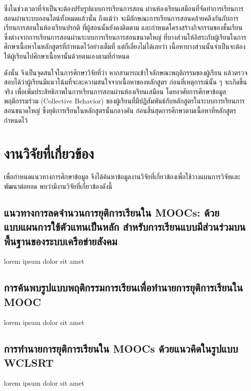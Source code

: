 \documentclass[conference]{IEEEtran}
\def\moocs{การเรียนการสอนขนาดใหญ่}
\def\MOOCs{ระบบ{\moocs}}
\begin{document}
    ซึ่งในช่วงเวลาที่จำเป็นจะต้องปรับรูปแบบการเรียนการสอน 
    ผ่านห้องเรียนเสมือนที่จัดทำการเรียนการสอนผ่านระบบออนไลน์ทั้งหมดแล้วนั้น
    ถึงแม้ว่า จะมีลักษณะการเรียนการสอนคล้ายคลึงกันกับการเรียนการสอนในห้องเรียนปรกติ
    ที่ผู้สอนนั้นยังคงติดตาม และกำหนดโครงสร้างกิจกรรมของชั้นเรียน 
    ซึ่งต่างจากการเรียนการสอนผ่านระบบการเรียนการสอนขนาดใหญ่ 
    ที่บางส่วนให้อิสระกับผู้เรียนในการศึกษาเนื้อหาในหลักสูตรที่กำหนดไว้อย่างเต็มที่ 
    แต่ก็เลี่ยงไม่ได้เลยว่า เนื้อหาบางส่วนนั้นจำเป็นจะต้องให้ผู้เรียนไปศึกษาเนื้อหานั้นด้วยตนเองตามที่กำหนด
    
    ดังนั้น จึงเป็นจุดสนใจในการศึกษาวิจัยที่ว่า หากสามารถเข้าใจลักษณะพฤติกรรมของผู้เรียน
    แล้วตรวจสอบได้ว่าผู้เรียนมีแนวโน้มที่จะละความสนใจจากเนื้อหาของหลักสูตร
    ก่อนที่เหตุการณ์นั้น ๆ จะเกิดขึ้นจริง เพื่อเพิ่มประสิทธิภาพในการเรียนการสอนผ่านห้องเรียนเสมือน
    โดยอาศัยการศึกษาข้อมูลพฤติกรรมร่วม (Collective Behavior) 
    \cite{mooc:collectivebehavior} ของผู้เรียนที่มีปฏิสัมพันธ์กับหลักสูตรใน{\MOOCs} 
    ซึ่งยุติการเรียนในหลักสูตรนั้นกลางคัน ก่อนสิ้นสุดการศึกษาตามเนื้อหาที่หลักสูตรกำหนดไว้

    \section{งานวิจัยที่เกี่ยวข้อง}

    เพื่อกำหนดแนวทางการศึกษาข้อมูล 
    จึงได้ค้นหาข้อมูลงานวิจัยที่เกี่ยวข้องเพื่อใช้วางแผนการวิจัยและพัฒนาต่อยอด 
    พบว่ามีงานวิจัยที่เกี่ยวข้องดังนี้

    \subsection{แนวทางการลดจำนวนการยุติการเรียนใน MOOCs: ด้วยแบบแผนการใช้ตัวแทนเป็นหลัก สำหรับการเรียนแบบมีส่วนร่วมบนพื้นฐานของระบบเครือข่ายสังคม \cite{paper:8924433}}
    lorem ipsum dolor sit amet

    \subsection{การค้นพบรูปแบบพฤติกรรมการเรียนเพื่อทำนายการยุติการเรียนใน MOOC \cite{paper:8085583}}
    lorem ipsum dolor sit amet

    \subsection{การทำนายการยุติการเรียนใน MOOCs ด้วยแนวคิดในรูปแบบ WCLSRT \cite{paper:9390886}}
    lorem ipsum dolor sit amet
\end{document}
